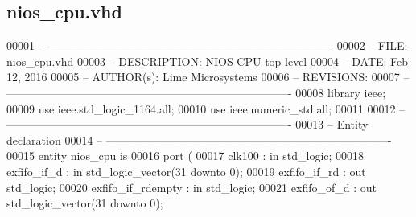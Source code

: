 \subsection{nios\+\_\+cpu.\+vhd}
\label{nios__cpu_8vhd_source}

\begin{DoxyCode}
00001 \textcolor{keyword}{-- ---------------------------------------------------------------------------- }
00002 \textcolor{keyword}{-- FILE:  nios\_cpu.vhd}
00003 \textcolor{keyword}{-- DESCRIPTION: NIOS CPU top level}
00004 \textcolor{keyword}{-- DATE: Feb 12, 2016}
00005 \textcolor{keyword}{-- AUTHOR(s): Lime Microsystems}
00006 \textcolor{keyword}{-- REVISIONS:}
00007 \textcolor{keyword}{-- ---------------------------------------------------------------------------- }
00008 \textcolor{vhdlkeyword}{library }\textcolor{keywordflow}{ieee};
00009 \textcolor{vhdlkeyword}{use }ieee.std\_logic\_1164.\textcolor{keywordflow}{all};
00010 \textcolor{vhdlkeyword}{use }ieee.numeric\_std.\textcolor{keywordflow}{all};
00011 
00012 \textcolor{keyword}{-- ----------------------------------------------------------------------------}
00013 \textcolor{keyword}{-- Entity declaration}
00014 \textcolor{keyword}{-- ----------------------------------------------------------------------------}
00015 \textcolor{keywordflow}{entity }nios_cpu \textcolor{keywordflow}{is}
00016    \textcolor{keywordflow}{port} \textcolor{vhdlchar}{(}
00017       \textcolor{vhdlchar}{clk100}            \textcolor{vhdlchar}{:} \textcolor{keywordflow}{in}    \textcolor{comment}{std\_logic};
00018       \textcolor{vhdlchar}{exfifo_if_d}       \textcolor{vhdlchar}{:} \textcolor{keywordflow}{in}    \textcolor{comment}{std\_logic\_vector}\textcolor{vhdlchar}{(}\textcolor{vhdllogic}{}\textcolor{vhdllogic}{31} \textcolor{keywordflow}{downto} \textcolor{vhdllogic}{}\textcolor{vhdllogic}{0}\textcolor{vhdlchar}{)};
00019       \textcolor{vhdlchar}{exfifo_if_rd}      \textcolor{vhdlchar}{:} \textcolor{keywordflow}{out}   \textcolor{comment}{std\_logic};
00020       \textcolor{vhdlchar}{exfifo_if_rdempty} \textcolor{vhdlchar}{:} \textcolor{keywordflow}{in}    \textcolor{comment}{std\_logic};
00021       \textcolor{vhdlchar}{exfifo_of_d}       \textcolor{vhdlchar}{:} \textcolor{keywordflow}{out}   \textcolor{comment}{std\_logic\_vector}\textcolor{vhdlchar}{(}\textcolor{vhdllogic}{}\textcolor{vhdllogic}{31} \textcolor{keywordflow}{downto} \textcolor{vhdllogic}{}\textcolor{vhdllogic}{0}\textcolor{vhdlchar}{)};

\end{DoxyCode}
